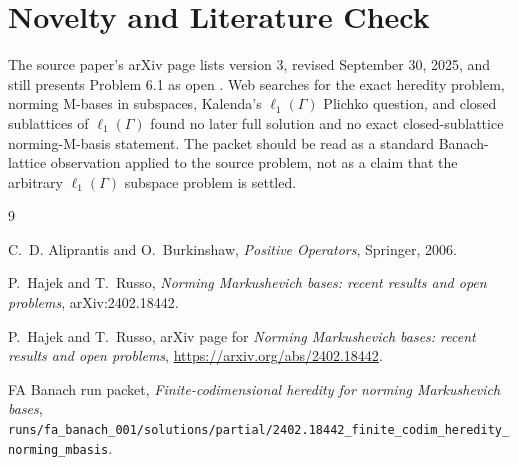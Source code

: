 \documentclass[11pt]{amsart}
\theoremstyle{definition}
\begin{document}
\section*{Novelty and Literature Check}

The source paper's arXiv page lists version 3, revised September 30, 2025,
and still presents Problem 6.1 as open \cite{HRarxiv}. Web searches for
the exact heredity problem, norming M-bases in subspaces, Kalenda's
\(\ell_1(\Gamma)\) Plichko question, and closed sublattices of
\(\ell_1(\Gamma)\) found no later full solution and no exact
closed-sublattice norming-M-basis statement. The packet should be read as
a standard Banach-lattice observation applied to the source problem, not
as a claim that the arbitrary \(\ell_1(\Gamma)\) subspace problem is
settled.

\begin{thebibliography}{9}

C.~D. Aliprantis and O.~Burkinshaw,
\emph{Positive Operators},
Springer, 2006.

P.~Hajek and T.~Russo,
\emph{Norming Markushevich bases: recent results and open problems},
arXiv:2402.18442.

P.~Hajek and T.~Russo,
arXiv page for \emph{Norming Markushevich bases: recent results and open
problems}, \url{https://arxiv.org/abs/2402.18442}.

FA Banach run packet,
\emph{Finite-codimensional heredity for norming Markushevich bases},
\texttt{runs/fa\_banach\_001/solutions/partial/2402.18442\_finite\_codim\_heredity\_norming\_mbasis}.

\end{thebibliography}
\end{document}
